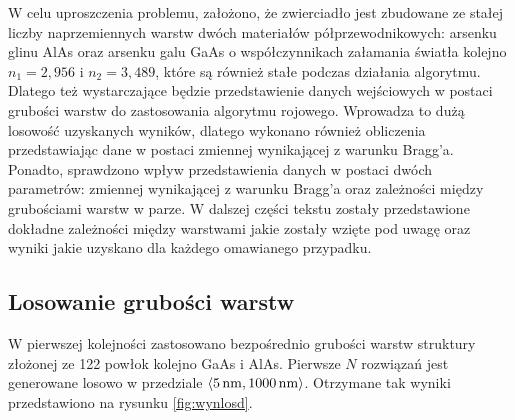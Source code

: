 W celu uproszczenia problemu, założono, że zwierciadło jest zbudowane ze stałej liczby naprzemiennych warstw dwóch materiałów półprzewodnikowych: arsenku glinu AlAs oraz arsenku galu GaAs o współczynnikach załamania światła kolejno $n_1=2,956$ i $n_2=3,489$, które są również stałe podczas działania algorytmu. Dlatego też wystarczające będzie przedstawienie danych wejściowych w postaci grubości warstw do zastosowania algorytmu rojowego. Wprowadza to dużą losowość uzyskanych wyników, dlatego wykonano również obliczenia przedstawiając dane w postaci zmiennej wynikającej z warunku Bragg'a. Ponadto, sprawdzono wpływ przedstawienia danych w postaci dwóch parametrów: zmiennej wynikającej z warunku Bragg'a oraz zależności między grubościami warstw w parze. W dalszej części tekstu zostały przedstawione dokładne zależności między warstwami jakie zostały wzięte pod uwagę oraz wyniki jakie uzyskano dla każdego omawianego przypadku.

\subsection{Losowanie grubości warstw}

W pierwszej kolejności zastosowano bezpośrednio grubości warstw struktury złożonej ze 122 powłok kolejno GaAs i AlAs. Pierwsze $N$ rozwiązań jest generowane losowo w przedziale $\langle 5\,\mathrm{nm}, 1000\,\mathrm{nm} \rangle$. Otrzymane tak wyniki przedstawiono na rysunku \ref{fig:wynlosd}.

